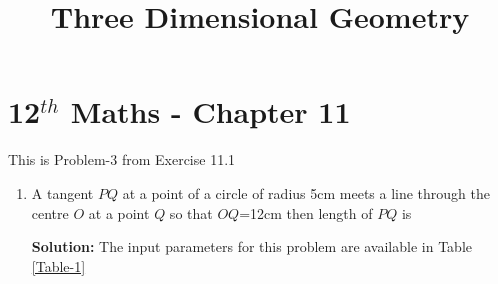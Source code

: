 \documentclass[12pt]{article}
\newcommand{\solution}{\noindent \textbf{Solution: }}
\begin{document}
\begin{center}
\enlargethispage{-4cm}
\title{\textbf{Three Dimensional Geometry}}
\date{\vspace{-5ex}} %
\maketitle
\end{center}
\setcounter{page}{1}
\section*{12$^{th}$ Maths - Chapter 11}
This is Problem-3 from Exercise 11.1
\begin{enumerate}
\item A tangent $PQ$ at a point of a circle of radius 5cm meets a line through the centre $O$ at a point $Q$ so that $OQ$=12cm then length of $PQ$ is

\solution
The input parameters for this problem are available in Table \eqref{Table-1}


\end{enumerate}
\end{document}
